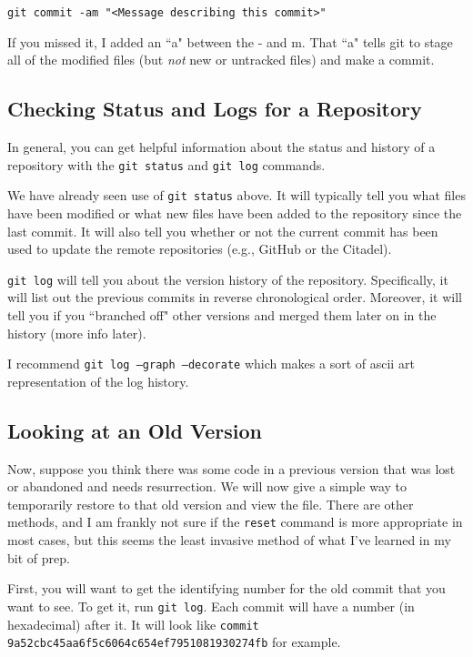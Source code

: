 \documentclass[11pt]{article}
\newcommand{\code}[1]{\quad \texttt{#1}}
\begin{document}
\code{git commit -am "<Message describing this commit>"}
 
If you missed it, I added an ``a" between the - and m.  That ``a" tells git to stage all of the modified files (but \emph{not} new or untracked files) and make a commit.
 
\subsection{Checking Status and Logs for a Repository}
  
In general, you can get helpful information about the status and history of a repository with the \texttt{git status} and \texttt{git log} commands.  
  
We have already seen use of \texttt{git status} above.  It will typically tell you what files have been modified or what new files have been added to the repository since the last commit.  It will also tell you whether or not the current commit has been used to update the remote repositories (e.g., GitHub or the Citadel).

\texttt{git log} will tell you about the version history of the repository.  Specifically, it will list out the previous commits in reverse chronological order.  Moreover, it will tell you if you ``branched off" other versions and merged them later on in the history (more info later).  

I recommend \texttt{git log --graph --decorate} which makes a sort of ascii art representation of the log history.
 
 \subsection{Looking at an Old Version}
 
 Now, suppose you think there was some code in a previous version that was lost or abandoned and needs resurrection.  We will now give a simple way to temporarily restore to that old version and view the file.  There are other methods, and I am frankly not sure if the \texttt{reset} command is more appropriate in most cases, but this seems the least invasive method of what I've learned in my bit of prep.

First, you will want to get the identifying number for the old commit that you want to see.  To get it, run \texttt{git log}.  Each commit will have a number (in hexadecimal) after it.  It will look like \texttt{commit 9a52cbc45aa6f5c6064c654ef7951081930274fb} for example.  
\end{document}
